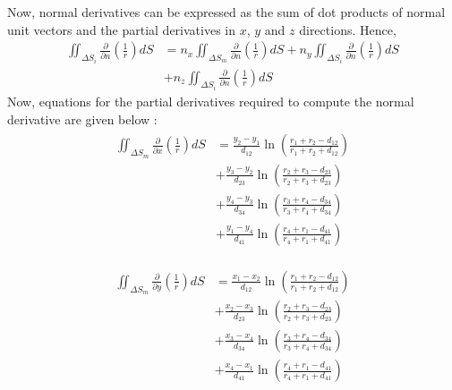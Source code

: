 Now, normal derivatives can be expressed as the sum of dot products of normal unit vectors and the partial derivatives in $x$, $y$ and $z$ directions. Hence, 
\begin{align}
    \iint_{\Delta S_i} \frac{\partial}{\partial n}\left(\frac{1}{r}\right) dS &= n_x \iint_{\Delta S_m} \frac{\partial}{\partial n}\left(\frac{1}{r}\right) dS + n_y \iint_{\Delta S_i} \frac{\partial}{\partial n}\left(\frac{1}{r}\right) dS
    \\ &+ n_z \iint_{\Delta S_i}\frac{\partial}{\partial n}\left(\frac{1}{r}\right) dS
    \label{eq:alpha_panel_comp}
\end{align}
Now, equations for the partial derivatives required to compute the normal derivative are given below :
\begin{align}
    \begin{split}
        \label{eq:partial_r_x}
        \iint_{\Delta S_m} \frac{\partial}{\partial x}\left(\frac{1}{r}\right) dS &=\frac{y_{2}-y_{1}}{d_{12}} \ln \left(\frac{r_{1}+r_{2}-d_{12}}{r_{1}+r_{2}+d_{12}}\right)\\ 
        &+ \frac{y_{3}-y_{2}}{d_{23}} \ln \left(\frac{r_{2}+r_{3}-d_{23}}{r_{2}+r_{3}+d_{23}}\right)\\ &+\frac{y_{4}-y_{3}}{d_{34}} \ln \left(\frac{r_{3}+r_{4}-d_{34}}{r_{3}+r_{4}+d_{34}}\right)\\
        &+\frac{y_{1}-y_{4}}{d_{41}} \ln \left(\frac{r_{4}+r_{1}-d_{41}}{r_{4}+r_{1}+d_{41}}\right)
    \end{split}
\end{align}

\begin{align}
    \begin{split}
        \label{eq:partial_r_y}
        \iint_{\Delta S_m} \frac{\partial}{\partial y}\left(\frac{1}{r}\right) d S
        &= \frac{x_{1}-x_{2}}{d_{12}} \ln \left(\frac{r_{1}+r_{2}-d_{12}}{r_{1}+r_{2}+d_{12}}\right)\\ &+\frac{x_{2}-x_{3}}{d_{23}} \ln \left(\frac{r_{2}+r_{3}-d_{23}}{r_{2}+r_{3}+d_{23}}\right) \\
        &+\frac{x_{3}-x_{4}}{d_{34}} \ln \left(\frac{r_{3}+r_{4}-d_{34}}{r_{3}+r_{4}+d_{34}}\right)\\ &+\frac{x_{4}-x_{1}}{d_{41}} \ln \left(\frac{r_{4}+r_{1}-d_{41}}{r_{4}+r_{1}+d_{41}}\right)
    \end{split}
\end{align}

